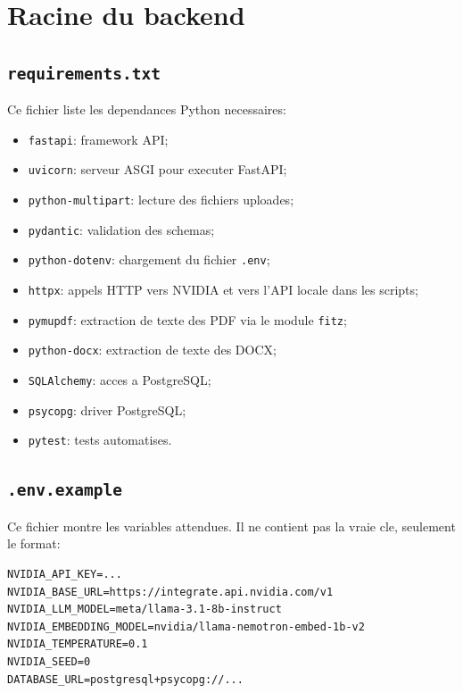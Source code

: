 \documentclass[12pt,a4paper]{article}
\begin{document}
\section{Racine du backend}

\subsection{\texttt{requirements.txt}}

Ce fichier liste les dependances Python necessaires:

\begin{itemize}
  \item \texttt{fastapi}: framework API;
  \item \texttt{uvicorn}: serveur ASGI pour executer FastAPI;
  \item \texttt{python-multipart}: lecture des fichiers uploades;
  \item \texttt{pydantic}: validation des schemas;
  \item \texttt{python-dotenv}: chargement du fichier \texttt{.env};
  \item \texttt{httpx}: appels HTTP vers NVIDIA et vers l'API locale dans les scripts;
  \item \texttt{pymupdf}: extraction de texte des PDF via le module \texttt{fitz};
  \item \texttt{python-docx}: extraction de texte des DOCX;
  \item \texttt{SQLAlchemy}: acces a PostgreSQL;
  \item \texttt{psycopg}: driver PostgreSQL;
  \item \texttt{pytest}: tests automatises.
\end{itemize}

\subsection{\texttt{.env.example}}

Ce fichier montre les variables attendues. Il ne contient pas la vraie cle, seulement le format:

\begin{lstlisting}[style=smartcode]
NVIDIA_API_KEY=...
NVIDIA_BASE_URL=https://integrate.api.nvidia.com/v1
NVIDIA_LLM_MODEL=meta/llama-3.1-8b-instruct
NVIDIA_EMBEDDING_MODEL=nvidia/llama-nemotron-embed-1b-v2
NVIDIA_TEMPERATURE=0.1
NVIDIA_SEED=0
DATABASE_URL=postgresql+psycopg://...
\end{lstlisting}
\end{document}
